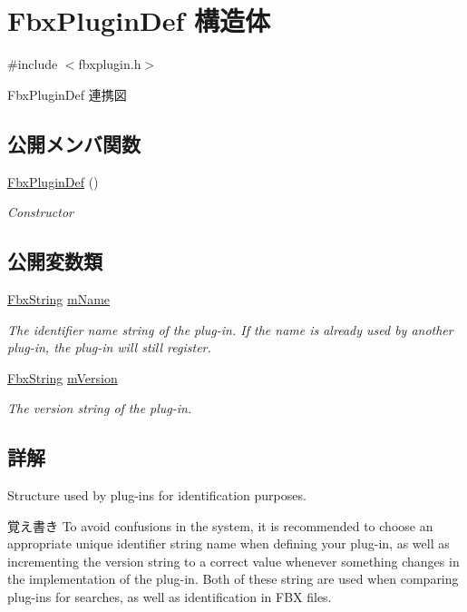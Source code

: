 \hypertarget{struct_fbx_plugin_def}{}\section{Fbx\+Plugin\+Def 構造体}
\label{struct_fbx_plugin_def}


{\ttfamily \#include $<$fbxplugin.\+h$>$}



Fbx\+Plugin\+Def 連携図
\subsection*{公開メンバ関数}
\begin{DoxyCompactItemize}
\item 
\hyperlink{struct_fbx_plugin_def_af1895c60f86c6d173758a6c3f6979d32}{Fbx\+Plugin\+Def} ()
\begin{DoxyCompactList}\small\item\em Constructor \end{DoxyCompactList}\end{DoxyCompactItemize}
\subsection*{公開変数類}
\begin{DoxyCompactItemize}
\item 
\hyperlink{class_fbx_string}{Fbx\+String} \hyperlink{struct_fbx_plugin_def_ac98378284bf666cbba614e9121ba7189}{m\+Name}
\begin{DoxyCompactList}\small\item\em The identifier name string of the plug-\/in. If the name is already used by another plug-\/in, the plug-\/in will still register. \end{DoxyCompactList}\item 
\hyperlink{class_fbx_string}{Fbx\+String} \hyperlink{struct_fbx_plugin_def_aeea048adb24ec74cb906df076bedf21d}{m\+Version}
\begin{DoxyCompactList}\small\item\em The version string of the plug-\/in. \end{DoxyCompactList}\end{DoxyCompactItemize}


\subsection{詳解}
Structure used by plug-\/ins for identification purposes. \begin{DoxyNote}{覚え書き}
To avoid confusions in the system, it is recommended to choose an appropriate unique identifier string name when defining your plug-\/in, as well as incrementing the version string to a correct value whenever something changes in the implementation of the plug-\/in. Both of these string are used when comparing plug-\/ins for searches, as well as identification in F\+BX files. 
\end{DoxyNote}


